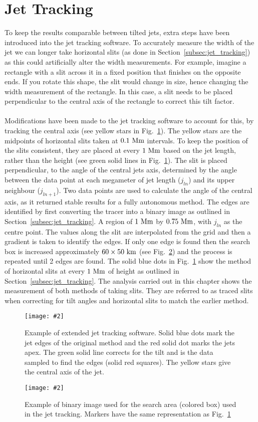 \documentclass[12pt]{ociamthesis}
\newcommand{\mfig}[4]{
  \begin{figure}
  \begin{center}
  \texttt{[image: \#2]}
  \caption{#3}
  \label{#4}
  \end{center}
  \end{figure}}
\newcommand{\np}{\\ \\}
\begin{document}
\section{Jet Tracking}
\label{sec:tjt}
To keep the results comparable between tilted jets, extra steps have been introduced into the jet tracking software. To accurately measure the width of the jet we can longer take horizontal slits (as done in Section~\ref{subsec:jet_tracking}) as this could artificially alter the width measurements. For example, imagine a rectangle with a slit across it in a fixed position that finishes on the opposite ends. If you rotate this shape, the slit would change in size, hence changing the width measurement of the rectangle. In this case, a slit needs to be placed perpendicular to the central axis of the rectangle to correct this tilt factor. \np
%
Modifications have been made to the jet tracking software to account for this, by tracking the central axis (see yellow stars in Fig.~\ref{imporved_j_track_example}). The yellow stars are the midpoints of horizontal slits taken at $0.1~\rm{Mm}$ intervals. To keep the position of the slits consistent, they are placed at every $1~\rm{Mm}$ based on the jet length, rather than the height (see green solid lines in Fig.~\ref{imporved_j_track_example}). The slit is placed perpendicular, to the angle of the central jets axis, determined by the angle between the data point at each megameter of jet length ($j_{ln}$) and its upper neighbour ($j_{ln+1}$). Two data points are used to calculate the angle of the central axis, as it returned stable results for a fully autonomous method. The edges are identified by first converting the tracer into a binary image as outlined in Section~\ref{subsec:jet_tracking}. A region of $1~\rm{Mm}$ by $0.75~\rm{Mm}$, with $j_{ln}$ as the centre point. The values along the slit are interpolated from the grid and then a gradient is taken to identify the edges. If only one edge is found then the search box is increased approximately $60\times 50~\rm{km}$ (see Fig.~\ref{search_box_j_track_example}) and the process is repeated until 2 edges are found. The solid blue dots in  Fig.~\ref{imporved_j_track_example} show the method of horizontal slits at every $1~\rm{Mm}$ of height as outlined in Section~\ref{subsec:jet_tracking}. The analysis carried out in this chapter shows the measurement of both methods of taking slits. They are referred to as traced slits when correcting for tilt angles and horizontal slits to match the earlier method.
\mfig{1}{figures/jet_P300_B60A_60T_0039.png}{Example of extended jet tracking software. Solid blue dots mark the jet edges of the original method and the red solid dot marks the jets apex. The green solid line corrects for the tilt and is the data sampled to find the edges (solid red squares). The yellow stars give the central axis of the jet.}{imporved_j_track_example}
\mfig{1}{figures/example_of_tilt_jet_code.png}{Example of binary image used for the search area (colored box) used in the jet tracking. Markers have the same representation as Fig.~\ref{imporved_j_track_example}}{search_box_j_track_example}
\end{document}
